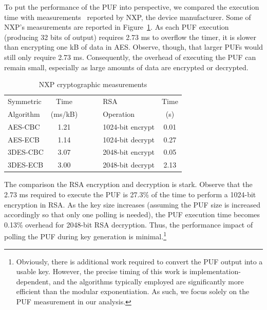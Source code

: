 To put the performance of the PUF into perspective, we compared the execution time with measurements~\cite{nxp}
reported by NXP, the device manufacturer.  Some of NXP's measurements are reported in Figure~\ref{fig:aes}.
As each PUF execution (producing 32 bits of output) requires 2.73 ms to overflow
the timer, it is slower than encrypting one kB of data in AES.  Observe, though, that larger PUFs would
still only require 2.73 ms.  Consequently, the overhead of executing the PUF can remain small, especially
as large amounts of data are encrypted or decrypted.

\begin{table}[!ht]
\vspace{-10pt}
\caption{NXP cryptographic measurements}
\begin{center}
\begin{tabular}{l | c c l | c}

Symmetric 	& Time		& ~~~	& RSA			& Time\\
Algorithm	& (ms/kB)	& ~~~	& Operation		& (s)\\
\cline{1-2}\cline{4-5}
AES-CBC		& 1.21		& ~	& 1024-bit encrypt	& 0.01 \\
AES-ECB		& 1.14 		& ~	& 1024-bit decrypt	& 0.27 \\
3DES-CBC	& 3.07		& ~	& 2048-bit encrypt	& 0.05 \\
3DES-ECB	& 3.00		& ~	& 2048-bit decrypt	& 2.13
\end{tabular}
\label{fig:aes}
\end{center}
\vspace{-25pt}
\end{table}

The comparison the RSA encryption and decryption is stark.  Observe that the 2.73 ms required to
execute the PUF is 27.3\% of the time to perform a 1024-bit encryption in RSA.  As the key size
increases (assuming the PUF size is increased accordingly so that only one polling is needed),
the PUF execution time becomes 0.13\% overhead for 2048-bit RSA decryption.  Thus, the performance
impact of polling the PUF during key generation is minimal.\footnote{Obviously, there is additional
work required to convert the PUF output into a usable key.  However, the precise timing of this
work is implementation-dependent, and the algorithms typically employed are significantly more
efficient than the modular exponentiation.  As such, we focus solely on the PUF measurement in
our analysis.}


